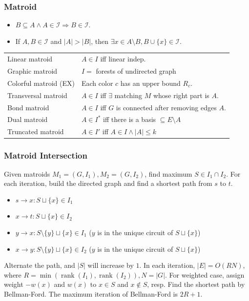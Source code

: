 \subsubsection{Matroid}
\begin{itemize}
  \item
    $B \subseteq A \land A \in \mathcal{I} \Rightarrow B \in \mathcal{I}$.
  \item
    If $A, B \in \mathcal{I}$ and $|A| > |B|$, then $\exists x \in A \setminus B, B \cup \{ x \} \in \mathcal{I}$.
\end{itemize}
\begin{tabular}{|l|l|}
  Linear matroid & $A \in I$ iff linear indep. \\
  Graphic matroid & $I =$ forests of undirected graph \\
  Colorful matroid (EX) & Each color $c$ has an upper bound $R_c$. \\
  Transversal matroid & $A \in I$ iff $\exists$ matching $M$ whose right part is $A$. \\
  Bond matroid & $A \in I$ iff $G$ is connected after removing edges $A$. \\
  Dual matroid & $A \in I^*$ iff there is a basis $\subseteq E \setminus A$ \\
  Truncated matroid & $A \in I'$ iff $A \in I \land |A| \leq k$ \\
\end{tabular}

\subsubsection{Matroid Intersection}
Given matroids \(M_1=(G,I_1),M_2=(G,I_2)\), find maximum \(S\in I_1\cap I_2\).
For each iteration, build the directed graph and find a shortest path from \(s\) to \(t\).
\begin{itemize}
    \item \(s \to x: S \sqcup \{x\} \in I_1\)
    \item \(x \to t: S \sqcup \{x\} \in I_2\)
    \item \(y \to x: S \setminus \{y\} \sqcup \{x\} \in I_1\) (\(y\) is in the unique circuit of \(S \sqcup \{x\}\))
    \item \(x \to y: S \setminus \{y\} \sqcup \{x\} \in I_2\) (\(y\) is in the unique circuit of \(S \sqcup \{x\}\))
\end{itemize}
Alternate the path, and \(|S|\) will increase by \(1\).
In each iteration, \(|E| = O(RN)\), where
\(R = \min(\operatorname{rank}(I_1), \operatorname{rank}(I_2)), N = |G|\).
For weighted case, assign weight \(-w(x)\) and \(w(x)\) to \(x\in S\) and \(x\notin S\), resp.
Find the shortest path by Bellman-Ford.
The maximum iteration of Bellman-Ford is \(2R+1\).

